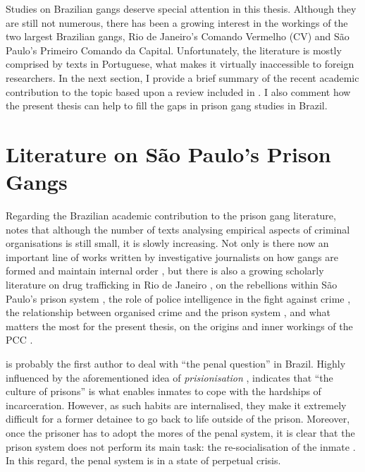 Studies on Brazilian gangs deserve special attention in this thesis. Although they are still not numerous, there has been a growing interest in the workings of the two largest Brazilian gangs, Rio de Janeiro's Comando Vermelho (CV) and S\~{a}o Paulo's Primeiro Comando da Capital. Unfortunately, the literature is mostly comprised by texts in Portuguese, what makes it virtually inaccessible to foreign researchers. In the next section, I provide a brief summary of the recent academic contribution to the topic based upon a review included in \citet{dias2011pulverizaccao}. I also comment how the present thesis can help to fill the gaps in prison gang studies in Brazil.

\section{Literature on S\~{a}o Paulo's Prison Gangs}

Regarding the Brazilian academic contribution to the prison gang literature, \citet[365]{dias2011pulverizaccao} notes that although the number of texts analysing empirical aspects of criminal organisations is still small, it is slowly increasing. Not only is there now an important line of works written by investigative journalists on how gangs are formed and maintain internal order \citep{amorim2003cv, barcellos2003abusado, jozino2004cobras, souza2007pcc}, but there is also a growing scholarly literature on drug trafficking in Rio de Janeiro \citep{lessing2008facccoes, zaluar1999debate}, on the rebellions within S\~{a}o Paulo's prison system \citep{adorno2007organized,da2009crime, salla2006rebelioes}, the role of police intelligence in the fight against crime \citep{mingardi2007trabalho}, the relationship between organised crime and the prison system \citep{ramalho1979mundo, pieta1993pavilhao, porto2007crime}, and what matters the most for the present thesis, on the origins and inner workings of the PCC \citep{biondi2010junto, dias2009guerra, dias2011pulverizaccao, marques2010liderancca}.

\citet{thompson1980questao} is probably the first author to deal with ``the penal question'' in Brazil. Highly influenced by the aforementioned idea of \textit{prisionisation} \citep{clemmer1940prison}, \citeauthor{thompson1980questao} indicates that ``the culture of prisons'' is what enables inmates to cope with the hardships of incarceration. However, as such habits are internalised, they make it extremely difficult for a former detainee to go back to life outside of the prison. Moreover, once the prisoner has to adopt the mores of the penal system, it is clear that the prison system does not perform its main task: the re-socialisation of the inmate \citep{silva2011visao}. In this regard, the penal system is in a state of perpetual crisis.

